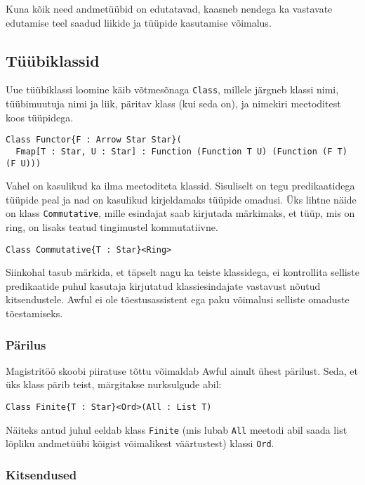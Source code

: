 \documentclass[12pt]{article}
\begin{document}
        Kuna kõik need andmetüübid on edutatavad, kaasneb nendega ka vastavate edutamise teel saadud liikide ja tüüpide kasutamise võimalus.
    \subsection{Tüübiklassid}
      Uue tüübiklassi loomine käib võtmesõnaga \verb!Class!, millele järgneb klassi nimi, tüübimuutuja nimi ja liik, päritav klass (kui seda on), ja nimekiri meetoditest koos tüüpidega.

      \begin{verbatim}Class Functor{F : Arrow Star Star}(
  Fmap[T : Star, U : Star] : Function (Function T U) (Function (F T) (F U)))\end{verbatim}

      Vahel on kasulikud ka ilma meetoditeta klassid. Sisuliselt on tegu predikaatidega tüüpide peal ja nad on kasulikud kirjeldamaks tüüpide omadusi. Üks lihtne näide on klass \verb!Commutative!, mille esindajat saab kirjutada märkimaks, et tüüp, mis on ring, on lisaks teatud tingimustel kommutatiivne.

      \begin{verbatim}Class Commutative{T : Star}<Ring>\end{verbatim}

      Siinkohal tasub märkida, et täpselt nagu ka teiste klassidega, ei kontrollita selliste predikaatide puhul kasutaja kirjutatud klassiesindajate vastavust nõutud kitsendustele. Awful ei ole tõestusassistent ega paku võimalusi selliste omaduste tõestamiseks.
      \subsubsection{Pärilus}
        Magistritöö skoobi piiratuse tõttu võimaldab Awful ainult ühest pärilust. Seda, et üks klass pärib teist, märgitakse nurksulgude abil:

        \begin{verbatim}Class Finite{T : Star}<Ord>(All : List T)\end{verbatim}

        Näiteks antud juhul eeldab klass \verb!Finite! (mis lubab \verb!All! meetodi abil saada list lõpliku andmetüübi kõigist võimalikest väärtustest) klassi \verb!Ord!.
      \subsubsection{Kitsendused}
        
\end{document}
